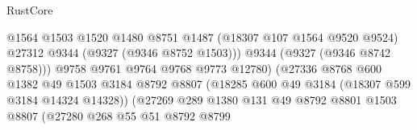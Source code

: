 \begin{lexlean}{RustCore}
\begin{coremodule}
                                                  @1564
                                                  @1503
                                                  @1520
                                                  @1480
                                                  @8751
                                                  @1487
                                                  (@18307 @107 @1564 @9520 @9524)
                                                  @27312
                                                  @9344
                                                  (@9327 (@9346 @8752 @1503)))
                                                @9344
                                                (@9327 (@9346 @8742 @8758)))
                                              @9758
                                              @9761
                                              @9764
                                              @9768
                                              @9773
                                              @12780)
                                            (@27336
                                              @8768
                                              @600
                                              @1382
                                              @49
                                              @1503
                                              @3184
                                              @8792
                                              @8807
                                              (@18285
                                                @600
                                                @49
                                                @3184
                                                (@18307 @599 @3184 @14324 @14328))
                                              (@27269
                                                @289
                                                @1380
                                                @131
                                                @49
                                                @8792
                                                @8801
                                                @1503
                                                @8807
                                                (@27280
                                                  @268
                                                  @55
                                                  @51
                                                  @8792
                                                  @8799

\end{coremodule}
\end{lexlean}
